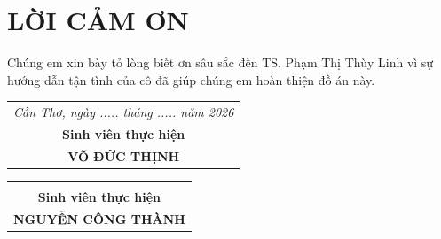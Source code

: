 \chapter*{LỜI CẢM ƠN}
\vspace{-15pt} %

Chúng em xin bày tỏ lòng biết ơn sâu sắc đến TS. Phạm Thị Thùy Linh vì sự hướng dẫn tận tình của cô đã giúp chúng em hoàn thiện đồ án này.

\vfill %

\noindent
\vfill
\begin{tabular}{@{}c@{}}
    \textit{Cần Thơ, ngày ..... tháng ..... năm 2026} \\[0.2cm]
    \textbf{Sinh viên thực hiện} \\[2cm] %
    \textbf{VÕ ĐỨC THỊNH}
\end{tabular}
\begin{tabular}{@{}c@{}}
    \textit{ } \\[0.2cm]
    \textbf{Sinh viên thực hiện} \\[2cm] %
    \textbf{NGUYỄN CÔNG THÀNH}
\end{tabular}
